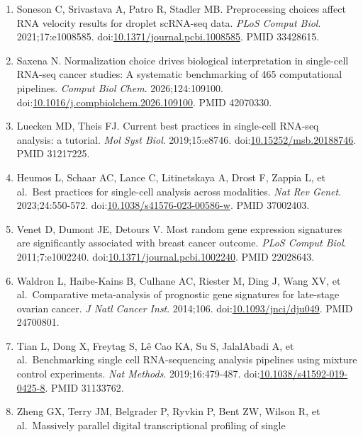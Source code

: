 \documentclass{article}
\begin{document}
\begin{enumerate}
  cell RNA-seq preprocessing tools. \emph{Genome Biol}. 2020;21:227.
  doi:\href{https://doi.org/10.1186/s13059-020-02136-7}{10.1186/s13059-020-02136-7}.
  PMID 32873325.
\item
  Soneson C, Srivastava A, Patro R, Stadler MB. Preprocessing choices
  affect RNA velocity results for droplet scRNA-seq data. \emph{PLoS
  Comput Biol}. 2021;17:e1008585.
  doi:\href{https://doi.org/10.1371/journal.pcbi.1008585}{10.1371/journal.pcbi.1008585}.
  PMID 33428615.
\item
  Saxena N. Normalization choice drives biological interpretation in
  single-cell RNA-seq cancer studies: A systematic benchmarking of 465
  computational pipelines. \emph{Comput Biol Chem}. 2026;124:109100.
  doi:\href{https://doi.org/10.1016/j.compbiolchem.2026.109100}{10.1016/j.compbiolchem.2026.109100}.
  PMID 42070330.
\item
  Luecken MD, Theis FJ. Current best practices in single-cell RNA-seq
  analysis: a tutorial. \emph{Mol Syst Biol}. 2019;15:e8746.
  doi:\href{https://doi.org/10.15252/msb.20188746}{10.15252/msb.20188746}.
  PMID 31217225.
\item
  Heumos L, Schaar AC, Lance C, Litinetskaya A, Drost F, Zappia L, et
  al.~Best practices for single-cell analysis across modalities.
  \emph{Nat Rev Genet}. 2023;24:550-572.
  doi:\href{https://doi.org/10.1038/s41576-023-00586-w}{10.1038/s41576-023-00586-w}.
  PMID 37002403.
\item
  Venet D, Dumont JE, Detours V. Most random gene expression signatures
  are significantly associated with breast cancer outcome. \emph{PLoS
  Comput Biol}. 2011;7:e1002240.
  doi:\href{https://doi.org/10.1371/journal.pcbi.1002240}{10.1371/journal.pcbi.1002240}.
  PMID 22028643.
\item
  Waldron L, Haibe-Kains B, Culhane AC, Riester M, Ding J, Wang XV, et
  al.~Comparative meta-analysis of prognostic gene signatures for
  late-stage ovarian cancer. \emph{J Natl Cancer Inst}. 2014;106.
  doi:\href{https://doi.org/10.1093/jnci/dju049}{10.1093/jnci/dju049}.
  PMID 24700801.
\item
  Tian L, Dong X, Freytag S, Lê Cao KA, Su S, JalalAbadi A, et
  al.~Benchmarking single cell RNA-sequencing analysis pipelines using
  mixture control experiments. \emph{Nat Methods}. 2019;16:479-487.
  doi:\href{https://doi.org/10.1038/s41592-019-0425-8}{10.1038/s41592-019-0425-8}.
  PMID 31133762.
\item
  Zheng GX, Terry JM, Belgrader P, Ryvkin P, Bent ZW, Wilson R, et
  al.~Massively parallel digital transcriptional profiling of single

\end{enumerate}
\end{document}
